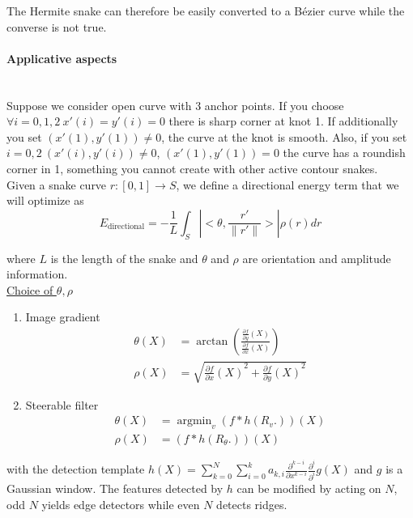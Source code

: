 \documentclass[a4paper, 11pt]{article}
\DeclareMathOperator*{\argmin}{argmin}
\begin{document}
The Hermite snake can therefore be easily converted to a Bézier curve while the converse is not true.

\paragraph{Applicative aspects} \mbox{} \\

Suppose we consider open curve with 3 anchor points. If you choose $\forall i=0, 1,2 \ x'(i) = y'(i) = 0$ there is sharp 
corner at knot 1. If additionally you set $(x'(1), y'(1)) \neq 0$, the curve at the knot is smooth. Also, if you set 
$i=0, 2 \ (x'(i), y'(i)) \neq 0$, $(x'(1), y'(1))=0$ the curve has a roundish corner in 1, something you cannot create 
with other active contour snakes. \\

Given a snake curve $r:[0,1] \to S$, we define a directional energy term that we will optimize as
\begin{equation}
    E_{\text{directional}} = - \frac{1}{L} \int_{S} \left| <\theta, \frac{r'}{\|r'\|}>\right| \rho(r)dr
\end{equation}

where $L$ is the length of the snake and $\theta$ and $\rho$ are orientation and amplitude information. \\

\underline{Choice of $\theta, \rho$}
\begin{enumerate}
  \item{Image gradient}
    \begin{align}
      \theta(X) &= \arctan\left(\frac{\frac{\partial f}{\partial y}(X)}{\frac{\partial f}{\partial x}(X)} \right) \\
      \rho(X) &= \sqrt{{\frac{\partial f}{\partial x}(X)}^2 + {\frac{\partial f}{\partial y}(X)}^2}
    \end{align}
  \item{Steerable filter}
    \begin{align}
      \theta(X) &= \argmin_{v} (f * h(R_v.))(X) \\
      \rho(X) &= (f * h(R_{\theta}.))(X)
    \end{align}
\end{enumerate}

with the detection template $\displaystyle h(X) = \sum_{k=0}^N \sum_{i=0}^k a_{k,i} \frac{\partial^{k-i}}{\partial 
x^{k-i}} \frac{\partial^{i}}{\partial ^{i}} g(X)$ and $g$ is a Gaussian window. The features detected by $h$ can be 
modified by acting on $N$, odd $N$ yields edge detectors while even $N$ detects ridges.  
\end{document}
